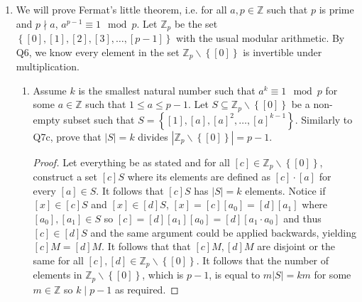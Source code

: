 \documentclass[letterpaper,12pt]{article}
\newcommand{\set}[1]{\left\{ #1 \right\}}
\begin{document}
\begin{enumerate}
\begin{enumerate}
\begin{proof}
        \end{proof}
        \item Prove that $|M|$ divides $n$. (Hint: consider equivalence classes under the relation where for all $[a], [b] \in \mathbb{Z}_n$, $[a] \sim [b]$ if and only if $[a] + [n-b] \in M$) \begin{proof}
            Let everything be as stated. For all $[c] \notin M$ but $[c] \in \mathbb{Z}_n$, construct a set $[c]+M$ where for all $[x] \in [c] + M$, $[x] = [c] + [a]$ for some $[a] \in M$. Notice by construction, $[c] + M$ has $|M|$ elements and every element in $\mathbb{Z}_n$ lies in some $[c] + M$. Notice if $[y] \in [c]+M$ and $[y] \in [d] + M$ for some $[c],[d] \in \mathbb{Z}_n$, then $[y] = [c] + [a_0] = [d] + [a_1]$ where $[a_0],[a_1] \in M$ so $[c] = [d] + [a_0] + [a_1] = d + [a_0+a_1]$ so $[c] \in [d] + M$ and the same argument could be applied backwards, yielding $[c] + M = [d] + M$. It follows that $[c]+M,[d]+M$ are disjoint or the same for all $[c],[d] \in \mathbb{Z}_n$. Hence, we know that $\mathbb{Z}_n$ is a disjoint union of sets of the form $[c] + M$, all of which have $|M|$ elements. It follows that the number of elements in $\mathbb{Z}_n$, which is $n$, is equal to $\ell|M|$ for some $\ell \in \mathbb{Z}$ so $|M|$ divides $n$ as required.
        \end{proof}
    \end{enumerate}
    \item We will prove Fermat's little theorem, i.e. for all $a ,p \in \mathbb{Z}$ such that $p$ is prime and $p \nmid a$, $a^{p-1} \equiv 1 \mod p$. Let $\mathbb{Z}_p$ be the set $\set{[0],[1],[2],[3],\ldots,[p-1]}$ with the usual modular arithmetic. By Q6, we know every element in the set $\mathbb{Z}_p \backslash \set{[0]}$ is invertible under multiplication. \begin{enumerate}
        \item Assume $k$ is the smallest natural number such that $a^k \equiv 1 \mod p$ for some $a \in \mathbb{Z}$ such that $1 \leq a \leq p-1$. Let $S \subseteq \mathbb{Z}_p \backslash \set{[0]}$ be a non-empty subset such that $S = \set{[1],[a],[a]^2, \ldots, [a]^{k-1}}$. Similarly to Q7c, prove that $|S| = k$ divides $|\mathbb{Z}_p \backslash \set{[0]}| = p-1$. \begin{proof}
            Let everything be as stated and for all $[c] \in \mathbb{Z}_p \backslash \set{[0]}$, construct a set $[c]S$ where its elements are defined as $[c] \cdot [a]$ for every $[a] \in S$. It follows that $[c] S$ has $|S| = k$ elements. Notice if $[x] \in [c]S$ and $[x] \in [d]S$, $[x] = [c][a_0] = [d][a_1]$ where $[a_0],[a_1] \in S$ so $[c] = [d][a_1][a_0] = [d][a_1 \cdot a_0]$ and thus $[c] \in [d]S$ and the same argument could be applied backwards, yielding $[c]M = [d]M$. It follows that that $[c]M,[d]M$ are disjoint or the same for all $[c],[d] \in \mathbb{Z}_p \backslash \set{[0]}$. It follows that the number of elements in $\mathbb{Z}_p \backslash \set{[0]}$, which is $p-1$, is equal to $m |S| = km$ for some $m \in \mathbb{Z}$ so $k \mid p-1$ as required.

\end{proof}
\end{enumerate}
\end{enumerate}
\end{document}
